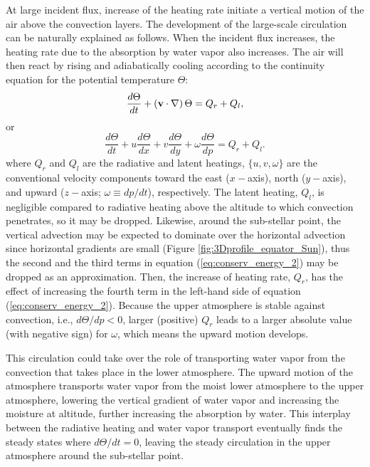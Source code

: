 \documentclass[11pt,numberedappendix,twocolappendix,]{emulateapj}
\begin{document}
At large incident flux, increase of the heating rate initiate a vertical motion of the air above the convection layers. 
The development of the large-scale circulation can be naturally explained as follows. 
When the incident flux increases, the heating rate due to the absorption by water vapor also increases. 
The air will then react by rising and adiabatically cooling according to the continuity equation for the potential temperature $\Theta $:
\begin{equation}
\frac{d\Theta }{dt} + ( {\bf v} \cdot \nabla ) \, \Theta = Q_r + Q_l, \label{eq:conserv_energy}
\end{equation}
or
\begin{equation}
\frac{d\Theta }{dt} + u \frac{d\Theta }{dx} + v \frac{d\Theta }{dy} + \omega \frac{d\Theta }{dp} = Q_r + Q_l. \label{eq:conserv_energy_2}
\end{equation}
where $Q_r$ and $Q_l$ are the radiative and latent heatings, $\{ u, v, \omega \}$ are the conventional velocity components toward the east ($x-$axis), north ($y-$axis), and upward ($z-$axis; $\omega \equiv  dp/dt$), respectively. 
The latent heating, $Q_l$, is negligible compared to radiative heating above the altitude to which convection penetrates, so it may be dropped. 
Likewise, around the sub-stellar point, the vertical advection may be expected to dominate over the horizontal advection since horizontal gradients are small (Figure \ref{fig:3Dprofile_equator_Sun}), thus the second and the third terms in equation (\ref{eq:conserv_energy_2}) may be dropped as an approximation. 
Then, the increase of heating rate, $Q_r$, has the effect of increasing the fourth term in the left-hand side of equation (\ref{eq:conserv_energy_2}). 
Because the upper atmosphere is stable against convection, i.e., $d \Theta / d p < 0 $, larger (positive) $Q_r$ leads to a larger absolute value (with negative sign) for $\omega $, which means the upward motion develops. 

This circulation could take over the role of transporting water vapor from the convection that takes place in the lower atmosphere.
The upward motion of the atmosphere transports water vapor from the moist lower atmosphere to the upper atmosphere, lowering the vertical gradient of water vapor and increasing the moisture at altitude, further increasing the absorption by water. 
This interplay between the radiative heating and water vapor transport eventually finds the steady states where $d\Theta/dt = 0$, leaving the steady circulation in the upper atmosphere around the sub-stellar point. 
\end{document}
